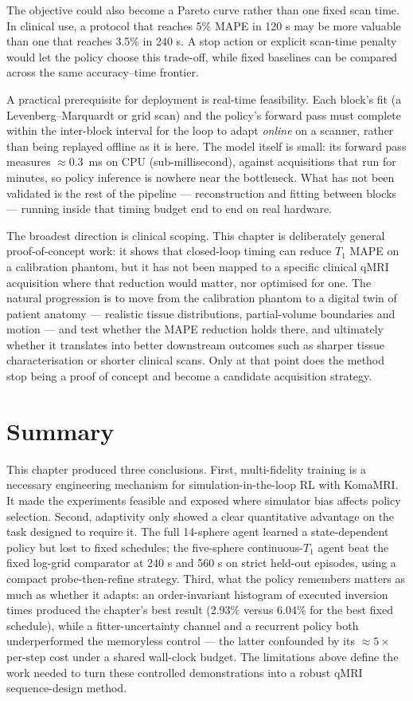 The objective could also become a Pareto curve rather than one fixed scan
time. In clinical use, a protocol that reaches 5\% MAPE in 120 s may be more
valuable than one that reaches 3.5\% in 240 s. A stop action or explicit
scan-time penalty would let the policy choose this trade-off, while fixed
baselines can be compared across the same accuracy--time frontier.

A practical prerequisite for deployment is real-time feasibility. Each block's
fit (a Levenberg--Marquardt or grid scan) and the policy's forward pass must
complete within the inter-block interval for the loop to adapt \emph{online} on
a scanner, rather than being replayed offline as it is here. The model itself is
small: its forward pass measures ${\approx}0.3$~ms on CPU (sub-millisecond),
against acquisitions that run for minutes, so policy inference is nowhere near
the bottleneck.
What has not been validated is the rest of the pipeline --- reconstruction and
fitting between blocks --- running inside that timing budget end to end on real
hardware.

The broadest direction is clinical scoping. This chapter is deliberately general
proof-of-concept work: it shows that closed-loop timing can reduce $T_1$ MAPE on
a calibration phantom, but it has not been mapped to a specific clinical qMRI
acquisition where that reduction would matter, nor optimised for one. The
natural progression is to move from the calibration phantom to a digital twin of
patient anatomy --- realistic tissue distributions, partial-volume boundaries
and motion --- and test whether the MAPE reduction holds there, and ultimately
whether it translates into better downstream outcomes such as sharper tissue
characterisation or shorter clinical scans. Only at that point does the method
stop being a proof of concept and become a candidate acquisition strategy.

\section{Summary}
\label{sec:e2-summary}

This chapter produced three conclusions. First, multi-fidelity training is a
necessary engineering mechanism for simulation-in-the-loop RL with KomaMRI. It
made the experiments feasible and exposed where simulator bias affects policy
selection. Second, adaptivity only showed a clear quantitative advantage on the
task designed to require it. The full 14-sphere agent learned a state-dependent
policy but lost to fixed schedules; the five-sphere continuous-$T_1$ agent beat
the fixed log-grid comparator at 240 s and 560 s on strict held-out episodes,
using a compact probe-then-refine strategy. Third, what the policy remembers
matters as much as whether it adapts: an order-invariant histogram of executed
inversion times produced the chapter's best result (2.93\% versus 6.04\% for
the best fixed schedule), while a fitter-uncertainty channel and a recurrent
policy both underperformed the memoryless control --- the latter confounded by
its ${\approx}5\times$ per-step cost under a shared wall-clock budget. The
limitations above define the work needed to turn these controlled
demonstrations into a robust qMRI sequence-design method.
